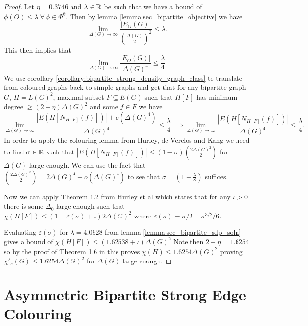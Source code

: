 \begin{proof}
    Let $\eta = 0.3746$ and $\lambda\in\mathbb{R}$ be such that we have a bound of
    $\phi(O) \leq \lambda\ \forall\ \phi\in\Phi^\emptyset$.
    Then by lemma \ref{lemma:sec_bipartite_objective} we have
    \[
        \lim_{\Delta(G) \to \infty}
        \frac{|E_O(G)|}{\binom{\Delta(G)}{2}^2}
        \leq \lambda.
    \]
    This then implies that
    \[
        \lim_{\Delta(G) \to \infty}
        \frac{|E_O(G)|}{\Delta(G)^4}
        \leq \frac{\lambda}{4}.
    \]
    We use corollary \ref{corollary:bipartite_strong_density_graph_class} to translate from
    coloured graphs back to simple graphs and get that for any bipartite graph $G$,
    $H = L(G)^2$, maximal subset $F\subseteq E(G)$ such that $H[F]$ has minimum degree
    $\geq (2-\eta)\Delta(G)^2$ and some $f\in F$ we have
    \[
        \lim_{\Delta(G) \to \infty}
        \frac{|E(H[N_{H[F]}(f)])| + o(\Delta(G)^4)}{\Delta(G)^4}
        \leq \frac{\lambda}{4}
        \implies
        \lim_{\Delta(G) \to \infty}
        \frac{|E(H[N_{H[F]}(f)])|}{\Delta(G)^4}
        \leq \frac{\lambda}{4}.
    \]
    In order to apply the colouring lemma from Hurley, de Verclos and Kang
    \cite{hurleyImprovedProcedureColouring2022} we need to find $\sigma\in\mathbb{R}$ such that
    $|E(H[N_{H[F]}(f)])| \leq (1-\sigma)\binom{2\Delta(G)^2}{2}$ for $\Delta(G)$ large
    enough. We can use the fact that
    $\binom{2\Delta(G)^2}{2} = 2\Delta(G)^4 - o(\Delta(G)^4)$
    to see that $\sigma = (1-\frac{\lambda}{8})$ suffices.

    Now we can apply Theorem 1.2 from Hurley et al \cite{hurleyImprovedProcedureColouring2022}
    which states that for any $\iota > 0$ there is some $\Delta_0$ large enough such that
    $\chi(H[F]) \leq (1-\varepsilon(\sigma) + \iota)2\Delta(G)^2$
    where $\varepsilon(\sigma) = \sigma/2 - \sigma^{3/2}/6$.

    Evaluating $\varepsilon(\sigma)$ for $\lambda = 4.0928$ from 
    lemma \ref{lemma:sec_bipartite_sdp_soln} gives a bound of
    $\chi(H[F]) \leq (1.62538 + \iota)\Delta(G)^2$
    Note then $2-\eta = 1.6254$ so by the proof of Theorem 1.6 in
    \cite{hurleyImprovedProcedureColouring2022}
    this proves $\chi(H) \leq 1.6254\Delta(G)^2$ proving
    $\chi'_s(G) \leq 1.6254\Delta(G)^2$ for $\Delta(G)$ large enough.
\end{proof}

\section{Asymmetric Bipartite Strong Edge Colouring}
\label{sec:asymmetric_bipartite_sec}

